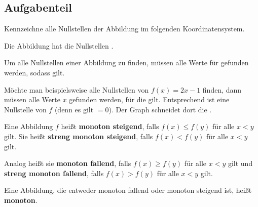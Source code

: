 \documentclass[]{uebungsblatt}
\begin{document}
\subsection*{Aufgabenteil}
\begin{exercise}
    Kennzeichne alle Nullstellen der Abbildung im folgenden Koordinatensystem.
    \begin{center}
    \end{center}
    Die Abbildung hat die Nullstellen .
\end{exercise}
\begin{exercise}
    Um alle Nullstellen einer Abbildung zu finden, müssen alle Werte für  gefunden werden, sodass  gilt. 
    
    Möchte man beispielsweise alle Nullstellen von $f(x)=2x-1$ finden, dann müssen alle Werte $x$ gefunden werden, für die  gilt. Entsprechend ist  eine Nullstelle von $f$ (denn es gilt $=0$). Der Graph schneidet dort die .
\end{exercise}
\begin{definition}
    Eine Abbildung $f$ heißt \textbf{monoton steigend}, falls $f(x)\leq f(y)$ für alle $x<y$ gilt. Sie heißt \textbf{streng monoton steigend}, falls $f(x)<f(y)$ für alle $x<y$ gilt.
    
    Analog heißt sie \textbf{monoton fallend}, falls $f(x)\geq f(y)$ für alle $x<y$ gilt und \textbf{streng monoton fallend}, falls $f(x)>f(y)$ für alle $x<y$ gilt.
    
    Eine Abbildung, die entweder monoton fallend oder monoton steigend ist, heißt \textbf{monoton}.
\end{definition}
\end{document}
